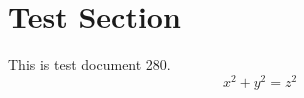 \documentclass{article}
\begin{document}
\section{Test Section}
This is test document 280.
\begin{equation}
x^2 + y^2 = z^2
\end{equation}
\end{document}
